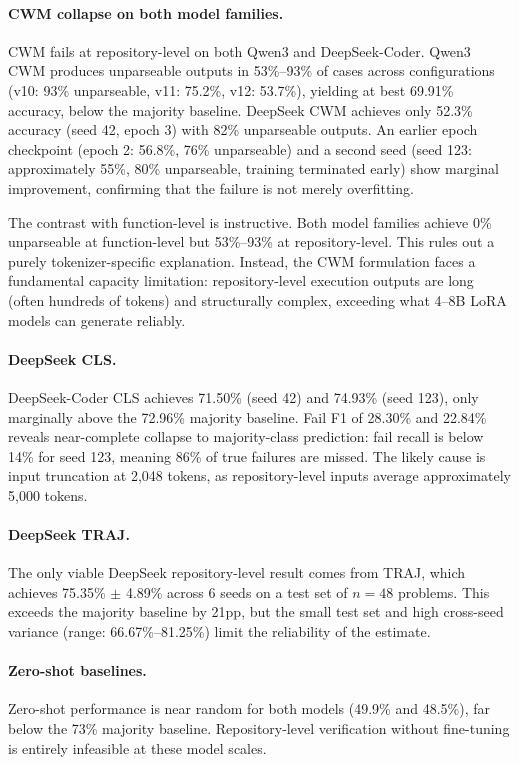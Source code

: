 \documentclass[11pt,a4paper]{article}
\begin{document}
\paragraph{CWM collapse on both model families.}
CWM fails at repository-level on both Qwen3 and DeepSeek-Coder. Qwen3 CWM produces unparseable outputs in 53\%--93\% of cases across configurations (v10: 93\% unparseable, v11: 75.2\%, v12: 53.7\%), yielding at best 69.91\% accuracy, below the majority baseline. DeepSeek CWM achieves only 52.3\% accuracy (seed 42, epoch 3) with 82\% unparseable outputs. An earlier epoch checkpoint (epoch 2: 56.8\%, 76\% unparseable) and a second seed (seed 123: approximately 55\%, 80\% unparseable, training terminated early) show marginal improvement, confirming that the failure is not merely overfitting.

The contrast with function-level is instructive. Both model families achieve 0\% unparseable at function-level but 53\%--93\% at repository-level. This rules out a purely tokenizer-specific explanation. Instead, the CWM formulation faces a fundamental capacity limitation: repository-level execution outputs are long (often hundreds of tokens) and structurally complex, exceeding what 4--8B LoRA models can generate reliably.

\paragraph{DeepSeek CLS.}
DeepSeek-Coder CLS achieves 71.50\% (seed 42) and 74.93\% (seed 123), only marginally above the 72.96\% majority baseline. Fail F1 of 28.30\% and 22.84\% reveals near-complete collapse to majority-class prediction: fail recall is below 14\% for seed 123, meaning 86\% of true failures are missed. The likely cause is input truncation at 2,048 tokens, as repository-level inputs average approximately 5,000 tokens.

\paragraph{DeepSeek TRAJ.}
The only viable DeepSeek repository-level result comes from TRAJ, which achieves 75.35\% $\pm$ 4.89\% across 6 seeds on a test set of $n{=}48$ problems. This exceeds the majority baseline by 21pp, but the small test set and high cross-seed variance (range: 66.67\%--81.25\%) limit the reliability of the estimate.

\paragraph{Zero-shot baselines.}
Zero-shot performance is near random for both models (49.9\% and 48.5\%), far below the 73\% majority baseline. Repository-level verification without fine-tuning is entirely infeasible at these model scales.
\end{document}
